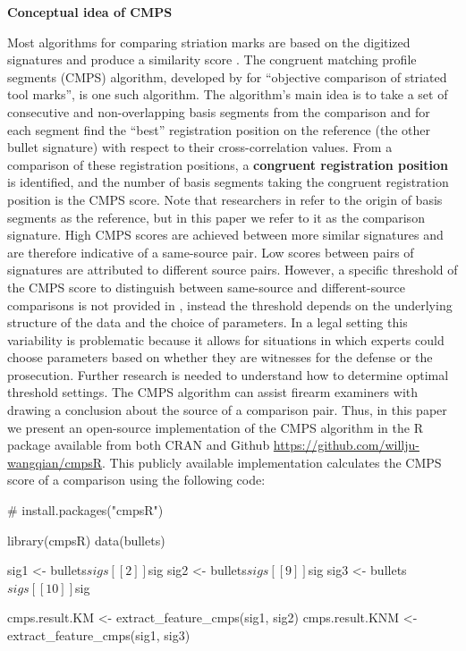 \textbf{Conceptual idea of CMPS}

Most algorithms for comparing striation marks are based on the digitized
signatures and produce a similarity score
\citep[\citet{ChumbleyL_Scott2010VoTM}, \citet{aoas},
\citet{pmid30444940}]{song2005}. The congruent matching profile segments
(CMPS) algorithm, developed by \citet{cmps} for ``objective comparison
of striated tool marks'', is one such algorithm. The algorithm's main
idea is to take a set of consecutive and non-overlapping basis segments
from the comparison and for each segment find the ``best'' registration
position on the reference (the other bullet signature) with respect to
their cross-correlation values. From a comparison of these registration
positions, a \textbf{congruent registration position} is identified, and
the number of basis segments taking the congruent registration position
is the CMPS score. Note that researchers in \citet{cmps} refer to the
origin of basis segments as the reference, but in this paper we refer to
it as the comparison signature. High CMPS scores are achieved between
more similar signatures and are therefore indicative of a same-source
pair. Low scores between pairs of signatures are attributed to different
source pairs. However, a specific threshold of the CMPS score to
distinguish between same-source and different-source comparisons is not
provided in \citet{cmps}, instead the threshold depends on the
underlying structure of the data and the choice of parameters. In a
legal setting this variability is problematic because it allows for
situations in which experts could choose parameters based on whether
they are witnesses for the defense or the prosecution. Further research
is needed to understand how to determine optimal threshold settings. The
CMPS algorithm can assist firearm examiners with drawing a conclusion
about the source of a comparison pair. Thus, in this paper we present an
open-source implementation of the CMPS algorithm in the R package
 available from both CRAN and Github
\url{https://github.com/willju-wangqian/cmpsR}. This publicly available
implementation calculates the CMPS score of a comparison using the
following code:

\begin{Schunk}
\begin{Sinput}
# install.packages("cmpsR") 

library(cmpsR)
data(bullets)

sig1 <- bullets$sigs[[2]]$sig
sig2 <- bullets$sigs[[9]]$sig
sig3 <- bullets$sigs[[10]]$sig

cmps.result.KM <- extract_feature_cmps(sig1, sig2)
cmps.result.KNM <- extract_feature_cmps(sig1, sig3)
\end{Sinput}
\end{Schunk}

